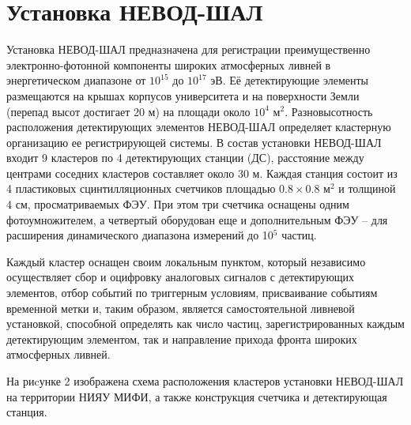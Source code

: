 \chapter*{Установка НЕВОД-ШАЛ}
\label{ch:intro}

Установка НЕВОД-ШАЛ \cite{amelchakov2022nevod} предназначена для регистрации преимущественно электронно-фотонной компоненты широких атмосферных ливней в энергетическом диапазоне от $10^{15}$ до $10^{17}$ эВ. Её детектирующие элементы размещаются на крышах корпусов университета и на поверхности Земли (перепад высот достигает 20 м) на площади около $10^4$ м$^2$. Разновысотность расположения детектирующих элементов НЕВОД-ШАЛ определяет кластерную организацию ее регистрирующей системы. В состав установки НЕВОД-ШАЛ входит 9 кластеров по 4 детектирующих станции (ДС), расстояние между центрами соседних кластеров составляет около 30 м. Каждая станция состоит из 4 пластиковых сцинтилляционных счетчиков площадью $0.8 \times 0.8$ м$^2$ и толщиной 4 см, просматриваемых ФЭУ. При этом три счетчика оснащены одним фотоумножителем, а четвертый оборудован еще и дополнительным ФЭУ – для расширения динамического диапазона измерений до 10$^5$ частиц.

Каждый кластер оснащен своим локальным пунктом, который независимо осуществляет сбор и оцифровку аналоговых сигналов с детектирующих элементов, отбор событий по триггерным условиям, присваивание событиям временной метки и, таким образом, является самостоятельной ливневой установкой, способной определять как число частиц, зарегистрированных каждым детектирующим элементом, так и направление прихода фронта широких атмосферных ливней. 

На риcунке 2 изображена схема расположения кластеров установки НЕВОД-ШАЛ на территории НИЯУ МИФИ, а также конструкция счетчика и детектирующая станция. 

